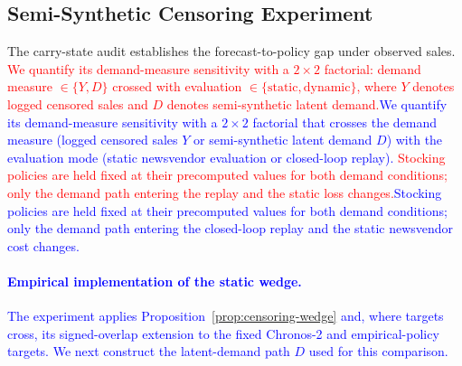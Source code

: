 \documentclass[msom,dblanonrev]{informs4}
\newcommand{\add}[1]{\textcolor{blue}{#1}}
\newcommand{\reduce}[1]{\textcolor{red}{#1}\hspace{0.5em}}
\begin{document}
\subsection{Semi-Synthetic Censoring Experiment}\label{sec:halfsynthetic}

The carry-state audit establishes the forecast-to-policy gap under observed sales.
\reduce{We quantify its demand-measure sensitivity with a $2\times 2$ factorial: demand measure $\in \{Y, D\}$ crossed with evaluation $\in \{\text{static}, \text{dynamic}\}$, where $Y$ denotes logged censored sales and $D$ denotes semi-synthetic latent demand.}\add{We quantify its demand-measure sensitivity with a $2\times 2$ factorial that crosses the demand measure (logged censored sales $Y$ or semi-synthetic latent demand $D$) with the evaluation mode (static newsvendor evaluation or closed-loop replay).}
\reduce{Stocking policies are held fixed at their precomputed values for both demand conditions; only the demand path entering the replay and the static loss changes.}\add{Stocking policies are held fixed at their precomputed values for both demand conditions; only the demand path entering the closed-loop replay and the static newsvendor cost changes.}

\paragraph{\add{Empirical implementation of the static wedge.}}
\add{The experiment applies Proposition~\ref{prop:censoring-wedge} and, where targets cross, its signed-overlap extension to the fixed Chronos-2 and empirical-policy targets. We next construct the latent-demand path $D$ used for this comparison.}
\end{document}
